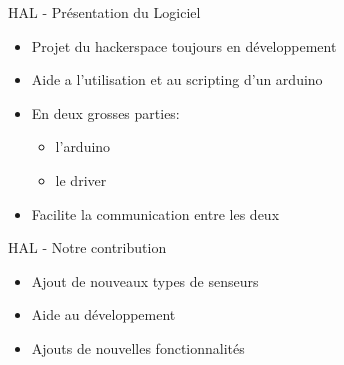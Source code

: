 \documentclass{beamer}
\begin{document}
		\begin{frame}{HAL - Présentation du Logiciel}
			\begin{itemize}
				\item Projet du hackerspace toujours en développement
				\item Aide a l'utilisation et au scripting d'un arduino
				\item En deux grosses parties:
				\begin{itemize}
					\item l'arduino
					\item le driver
				\end{itemize}
				\item Facilite la communication entre les deux
			\end{itemize}
		\end{frame}

		\begin{frame}{HAL - Notre contribution}
			\begin{itemize}
				\item Ajout de nouveaux types de senseurs
				\item Aide au développement
				\item Ajouts de nouvelles fonctionnalités
			\end{itemize}
		\end{frame}
\end{document}
